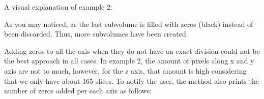 \documentclass[letterpaper,10pt,english]{sphinxmanual}
\begin{document}
\begin{fulllineitems}
\begin{sphinxVerbatim}[commandchars=\\\{\}]

         

\end{sphinxVerbatim}

A visual explanation of example 2:


As you may noticed, as  the last subvolume is filled with zeros (black) instead of been
discarded. Thus, more subvolumes have been created.

Adding zeros to all the axis when they do not have an exact division could not be the best approach in all cases.
In example 2, the amount of pixels along x and y axis are not to much, however, for the z axis, that amount is high
considering that we only have about 165 slices. To notify the user, the method also prints the number of zeros
added per each axis  as follows:

\begin{sphinxVerbatim}[commandchars=\\\{\}]
         
\end{sphinxVerbatim}

\end{fulllineitems}
\end{document}
